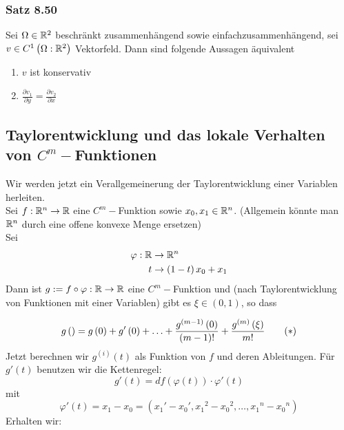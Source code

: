 \subsubsection*{Satz 8.50}
Sei $\Omega\in\mathbb{R}^2$ beschränkt zusammenhängend sowie einfachzusammenhängend, sei $v\in C^1\left( \Omega:\mathbb{R}^2\right)$ Vektorfeld. Dann sind folgende Aussagen äquivalent
\begin{enumerate}
\item $v$ ist konservativ
\item $\frac{\partial v_1}{\partial y}=\frac{\partial v_2}{\partial x}$
\end{enumerate}

\subsection*{Taylorentwicklung und das lokale Verhalten von $C^m-$Funktionen}
Wir werden jetzt ein Verallgemeinerung der Taylorentwicklung einer Variablen herleiten. \\

Sei $f:\mathbb{R}^n\to\mathbb{R}$ eine $C^m-$Funktion sowie $x_0,x_1\in\mathbb{R}^n$. (Allgemein könnte man $\mathbb{R}^n$ durch eine offene konvexe Menge ersetzen)\\

\noindent Sei
\begin{align*}
\varphi:\mathbb{R} &\to\mathbb{R}^n\\
t & \to \left( 1-t\right) x_0+x_1
\end{align*}
Dann ist $g:=f\circ\varphi:\mathbb{R}\to\mathbb{R}$ eine $C^m-$Funktion und (nach Taylorentwicklung  von Funktionen mit einer Variablen) gibt es $\xi\in (0,1)$, so dass

\[
g\left( {} \right) = g\left( 0 \right) + g'\left( 0 \right) +  \ldots  + \frac{{{g^{\left( {m - 1} \right)}}\left( 0 \right)}}{{\left( {m - 1} \right)!}} + \frac{{{g^{\left( m \right)}}\left( \xi  \right)}}{{m!}}\tag{\textasteriskcentered\label{Chap8Equation,Taylor}}
\]
Jetzt berechnen wir $g^{(i)}(t)$ als Funktion von $f$ und deren Ableitungen. Für $g'(t)$ benutzen wir die Kettenregel:
\[g'(t)=df\left( \varphi (t)\right) \cdot\varphi' (t)\] mit \[\varphi '(t) = {x_1} - {x_0} = \left( {{x_1}' - {x_0}',{x_1}^2 - {x_0}^2, \ldots ,{x_1}^n - {x_0}^n} \right)\] Erhalten wir:

